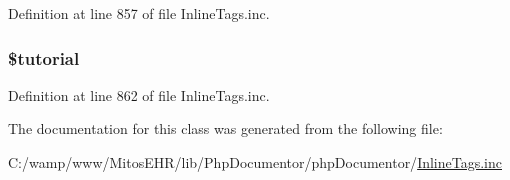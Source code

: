 \-Definition at line 857 of file \-Inline\-Tags.\-inc.

\hypertarget{classparser_id_inline_tag_a78498c66c97cfd4c420a7f2908b65f24}{
\subsubsection[{\$tutorial}]{\setlength{\rightskip}{0pt plus 5cm}\$tutorial}}\label{classparser_id_inline_tag_a78498c66c97cfd4c420a7f2908b65f24}


\-Definition at line 862 of file \-Inline\-Tags.\-inc.



\-The documentation for this class was generated from the following file\-:\begin{DoxyCompactItemize}
\item 
\-C\-:/wamp/www/\-Mitos\-E\-H\-R/lib/\-Php\-Documentor/php\-Documentor/\hyperlink{_inline_tags_8inc}{\-Inline\-Tags.\-inc}\end{DoxyCompactItemize}
